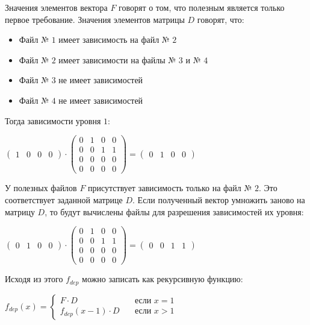 Значения элементов вектора $F$ говорят о том, что полезным является только первое требование. Значения элементов матрицы $D$ говорят, что:
\begin{itemize}
  \item Файл № $1$ имеет зависимость на файл № $2$
  \item Файл № $2$ имеет зависимости на файлы № $3$ и № $4$
  \item Файл № $3$ не имеет зависимостей
  \item Файл № $4$ не имеет зависимостей
\end{itemize}
Тогда зависимости уровня $1$:
\begin{center}
  $
  \begin{pmatrix}
    1 & 0 & 0 & 0 
  \end{pmatrix}
  \cdot
  \begin{pmatrix}
    0 & 1 & 0 & 0 \\
    0 & 0 & 1 & 1 \\
    0 & 0 & 0 & 0 \\
    0 & 0 & 0 & 0 
  \end{pmatrix}
  = 
  \begin{pmatrix}
    0 & 1 & 0 & 0 
  \end{pmatrix}
  $
\end{center}

У полезных файлов $F$ присутствует зависимость только на файл № $2$. Это соответствует заданной матрице $D$. Если полученный вектор умножить заново на матрицу $D$, то будут вычислены файлы для разрешения зависимостей их уровня:
\begin{center}
  $
  \begin{pmatrix}
    0 & 1 & 0 & 0 
  \end{pmatrix}
  \cdot
  \begin{pmatrix}
  0 & 1 & 0 & 0 \\
  0 & 0 & 1 & 1 \\
  0 & 0 & 0 & 0 \\
  0 & 0 & 0 & 0 
  \end{pmatrix}
  = 
  \begin{pmatrix}
    0 & 0 & 1 & 1 
  \end{pmatrix}
  $
\end{center}

Исходя из этого $f_{dep}$ можно записать как рекурсивную функцию:
\begin{center}
  $
  f_{dep}(x) = 
  \begin{cases}
    F \cdot D & \quad \text{если } x = 1 \\
    f_{dep}(x - 1) \cdot D & \quad \text{если } x > 1
  \end{cases}
  $
\end{center}

